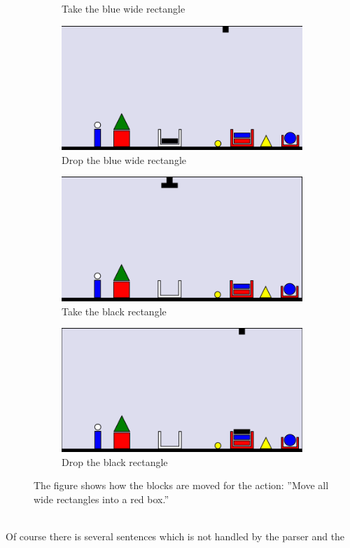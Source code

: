 \begin{figure}
\begin{subfigure}{.5\textwidth}
  \caption{Take the blue wide rectangle}
  \label{fig:8}
\end{subfigure}
\begin{subfigure}{.5\textwidth}
  \centering
  \includegraphics[width=.7\linewidth]{fig/9.png}
  \caption{Drop the blue wide rectangle}
  \label{fig:9}
\end{subfigure}%
\begin{subfigure}{.5\textwidth}
  \centering
  \includegraphics[width=.7\linewidth]{fig/10.png}
  \caption{Take the black rectangle}
  \label{fig:10}
\end{subfigure}
\begin{subfigure}{.5\textwidth}
  \centering
  \includegraphics[width=.7\linewidth]{fig/11.png}
  \caption{Drop the black rectangle}
  \label{fig:11}
\end{subfigure}
\caption{The figure shows how the blocks are moved for the action: ''Move all wide rectangles into a red 
box.''}
\label{fig:moveex}
\end{figure}\\
Of course there is several sentences which is not handled by the parser and the
